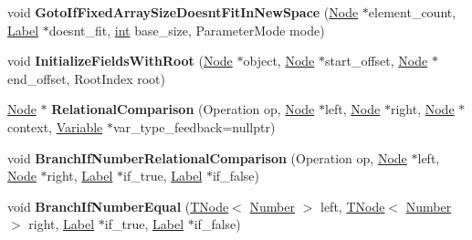 \begin{DoxyCompactItemize}
void {\bfseries Goto\+If\+Fixed\+Array\+Size\+Doesnt\+Fit\+In\+New\+Space} (\mbox{\hyperlink{classv8_1_1internal_1_1compiler_1_1Node}{Node}} $\ast$element\+\_\+count, \mbox{\hyperlink{classv8_1_1internal_1_1compiler_1_1CodeAssemblerLabel}{Label}} $\ast$doesnt\+\_\+fit, \mbox{\hyperlink{classint}{int}} base\+\_\+size, Parameter\+Mode mode)
\item 
\mbox{\label{classv8_1_1internal_1_1CodeStubAssembler_aad858896aa724e1c47ad1b483e3b5745}} 
void {\bfseries Initialize\+Fields\+With\+Root} (\mbox{\hyperlink{classv8_1_1internal_1_1compiler_1_1Node}{Node}} $\ast$object, \mbox{\hyperlink{classv8_1_1internal_1_1compiler_1_1Node}{Node}} $\ast$start\+\_\+offset, \mbox{\hyperlink{classv8_1_1internal_1_1compiler_1_1Node}{Node}} $\ast$end\+\_\+offset, Root\+Index root)
\item 
\mbox{\label{classv8_1_1internal_1_1CodeStubAssembler_a0c02d2f414edd11326c911f7d5a17019}} 
\mbox{\hyperlink{classv8_1_1internal_1_1compiler_1_1Node}{Node}} $\ast$ {\bfseries Relational\+Comparison} (Operation op, \mbox{\hyperlink{classv8_1_1internal_1_1compiler_1_1Node}{Node}} $\ast$left, \mbox{\hyperlink{classv8_1_1internal_1_1compiler_1_1Node}{Node}} $\ast$right, \mbox{\hyperlink{classv8_1_1internal_1_1compiler_1_1Node}{Node}} $\ast$context, \mbox{\hyperlink{classv8_1_1internal_1_1compiler_1_1CodeAssemblerVariable}{Variable}} $\ast$var\+\_\+type\+\_\+feedback=nullptr)
\item 
\mbox{\label{classv8_1_1internal_1_1CodeStubAssembler_a19c29dd75365e9de5227392ae9959032}} 
void {\bfseries Branch\+If\+Number\+Relational\+Comparison} (Operation op, \mbox{\hyperlink{classv8_1_1internal_1_1compiler_1_1Node}{Node}} $\ast$left, \mbox{\hyperlink{classv8_1_1internal_1_1compiler_1_1Node}{Node}} $\ast$right, \mbox{\hyperlink{classv8_1_1internal_1_1compiler_1_1CodeAssemblerLabel}{Label}} $\ast$if\+\_\+true, \mbox{\hyperlink{classv8_1_1internal_1_1compiler_1_1CodeAssemblerLabel}{Label}} $\ast$if\+\_\+false)
\item 
\mbox{\label{classv8_1_1internal_1_1CodeStubAssembler_a86cc02a7c2fd4a53cf0071e2e1847047}} 
void {\bfseries Branch\+If\+Number\+Equal} (\mbox{\hyperlink{classv8_1_1internal_1_1compiler_1_1TNode}{T\+Node}}$<$ \mbox{\hyperlink{structv8_1_1internal_1_1UnionT}{Number}} $>$ left, \mbox{\hyperlink{classv8_1_1internal_1_1compiler_1_1TNode}{T\+Node}}$<$ \mbox{\hyperlink{structv8_1_1internal_1_1UnionT}{Number}} $>$ right, \mbox{\hyperlink{classv8_1_1internal_1_1compiler_1_1CodeAssemblerLabel}{Label}} $\ast$if\+\_\+true, \mbox{\hyperlink{classv8_1_1internal_1_1compiler_1_1CodeAssemblerLabel}{Label}} $\ast$if\+\_\+false)

\end{DoxyCompactItemize}
